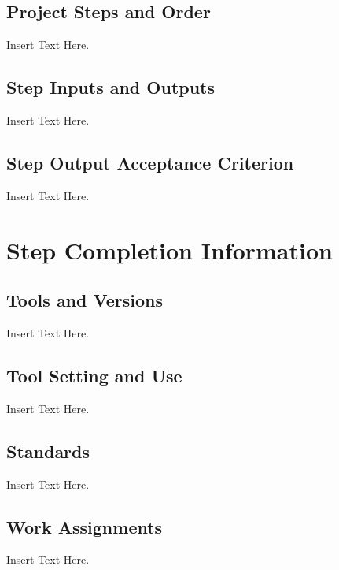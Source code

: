 \documentclass [12pt]{article}
\begin{document}
\subsection{Project Steps and Order}
Insert Text Here.

\subsection{Step Inputs and Outputs}
Insert Text Here.

\subsection{Step Output Acceptance Criterion}
Insert Text Here.





\section{Step Completion Information}

\subsection{Tools and Versions}
Insert Text Here.

\subsection{Tool Setting and Use}
Insert Text Here.


\subsection{Standards}
Insert Text Here. 

\subsection{Work Assignments}
Insert Text Here.
\end{document}

